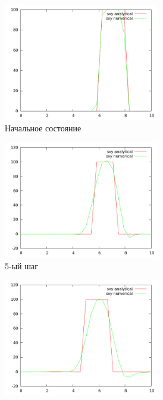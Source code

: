 \begin{figure}[H]
\begin{subfigure}[b]{0.5\textwidth}
\centering
\includegraphics[width=0.75\textwidth]{png/veryfication/0.8/s-wave-along-x0.png}
\caption{Начальное состояние}
\end{subfigure}
\begin{subfigure}[b]{0.5\textwidth}
\centering
\includegraphics[width=0.75\textwidth]{png/veryfication/0.8/s-wave-along-x5.png}
\caption{5-ый шаг}
\end{subfigure}
\begin{subfigure}[b]{0.5\textwidth}
\centering
\includegraphics[width=0.75\textwidth]{png/veryfication/0.8/s-wave-along-x10.png}

\end{subfigure}
\end{figure}
